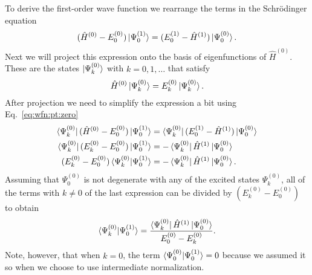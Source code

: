 \documentclass[../Main/chem532-notes.tex]{subfiles}
\begin{document}
To derive the first-order wave function we rearrange the terms in the Schr\"{o}dinger equation
\begin{equation}
(\hat{H}^{(0)} - E_0^{(0)})\ket{\Psi_0^{(1)}} = (E_0^{(1)} - \hat{H}^{(1)})\ket{\Psi_0^{(0)}}.
\end{equation}
Next we will project this expression onto the basis of eigenfunctions of $\hat{H}^{(0)}$. These are the states $\ket{\Psi_k^{(0)}}$ with $k = 0, 1, \ldots$ that satisfy
\begin{equation}
\label{eq:wfn:pt:zero}
\hat{H}^{(0)} \ket{\Psi_k^{(0)}}
= E_k^{(0)}  \ket{\Psi_k^{(0)}}.
\end{equation}
After projection we need to simplify the expression a bit using Eq.~\eqref{eq:wfn:pt:zero}
\begin{equation}
\begin{split}
\bra{\Psi_k^{(0)}}(\hat{H}^{(0)} - E_0^{(0)})\ket{\Psi_0^{(1)}} & = \bra{\Psi_k^{(0)}}(E_0^{(1)} - \hat{H}^{(1)})\ket{\Psi_0^{(0)}} \\
\bra{\Psi_k^{(0)}}(E_k^{(0)} - E_0^{(0)})\ket{\Psi_0^{(1)}} & = - \bra{\Psi_k^{(0)}} \hat{H}^{(1)}\ket{\Psi_0^{(0)}} \\
(E_k^{(0)} - E_0^{(0)}) \braket{\Psi_k^{(0)} | \Psi_0^{(1)}} & = - \bra{\Psi_k^{(0)}} \hat{H}^{(1)}\ket{\Psi_0^{(0)}}.
\end{split}
\end{equation}
Assuming that $\Psi_0^{(0)}$ is not degenerate with any of the excited states $\Psi_k^{(0)}$, all of the terms with $k \neq 0$ of the last expression can be divided by $(E_k^{(0)} - E_0^{(0)})$ to obtain
\begin{equation}
\label{eq:wfn:pt:overlap_01}
 \braket{\Psi_k^{(0)} | \Psi_0^{(1)}}  = \frac{\bra{\Psi_k^{(0)}} \hat{H}^{(1)}\ket{\Psi_0^{(0)}}}{E_0^{(0)} - E_k^{(0)}}.
\end{equation}
Note, however, that when $k = 0$, the term $\braket{\Psi_0^{(0)} | \Psi_0^{(1)}} = 0$ because we assumed it so when we choose to use intermediate normalization.
\end{document}
